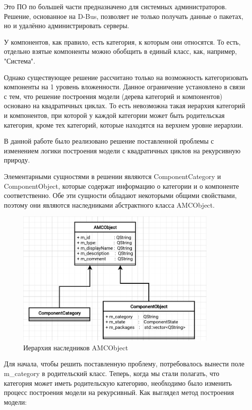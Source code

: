\documentclass[bachelor, och, pract]{SCWorks}
\begin{document}
Это ПО по большей части предназначено для системных администраторов.
Решение, основанное на D-Bus, позволяет не только получать данные о пакетах, но и удалённо администрировать серверы.

У компонентов, как правило, есть категория, к которым они относятся.
То есть, отдельно взятые компоненты можно обобщить в единый класс, как, например, "Система".

Однако существующее решение рассчитано только на возможность категоризовать компоненты на 1 уровень вложенности.
Данное ограничение установлено в связи с тем, что решение построения модели (дерева категорий и компонентов) основано на квадратичных циклах.
То есть невозможна такая иерархия категорий и компонентов, при которой у каждой категории может быть родительская категория, кроме тех категорий, которые находятся на верхнем уровне иерархии.

В данной работе было реализовано решение поставленной проблемы с изменением логики построения модели с квадратичных циклов на рекурсивную природу.

Элементарными сущностями в решении являются ComponentCategory и ComponentObject, которые содержат информацию о категории и о компоненте соответственно.
Обе эти сущности обладают некоторыми общими свойствами, поэтому они являются наследниками абстрактного класса AMCObject.

\begin{figure}[!ht]
	\centering
	\includegraphics[width=10cm]{amcobject.png}
	\caption{\label{fig:f3}%
	Иерархия наследников AMCObject}
\end{figure}

Для начала, чтобы решить поставленную проблему, потребовалось вынести поле m\_category в родительский класс.
Теперь, когда мы стали полагать, что категория может иметь родительскую категорию, необходимо было изменить процесс построения модели на рекурсивный.
Как выглядел метод построения модели:
\end{document}
